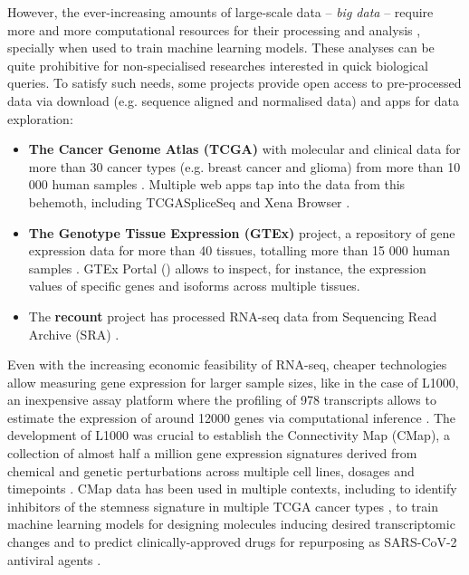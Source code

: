 However, the ever-increasing amounts of large-scale data -- \emph{big data} -- require more and more computational resources for their processing and analysis \cite{gauthier:2018ws}, specially when used to train machine learning models. These analyses can be quite prohibitive for non-specialised researches interested in quick biological queries. To satisfy such needs, some projects provide open access to pre-processed data via download (e.g. sequence aligned and normalised data) and apps for data exploration:

\begin{itemize}
	\item \textbf{The Cancer Genome Atlas (TCGA)} with molecular and clinical data for more than 30 cancer types (e.g. breast cancer and glioma) from more than 10 000 human samples \cite{chang:2013ww}. Multiple web apps tap into the data from this behemoth, including TCGASpliceSeq \cite{ryan:2016tm} and Xena Browser \cite{goldman:2020ub}.
	\item \textbf{The Genotype Tissue Expression (GTEx)} project, a repository of gene expression data for more than 40 tissues, totalling more than 15 000 human samples \cite{lonsdale:2013uo}. GTEx Portal () allows to inspect, for instance, the expression values of specific genes and isoforms across multiple tissues.
	\item The \textbf{recount} project has processed RNA-seq data from Sequencing Read Archive (SRA) \cite{collado-torres:2017uw,wilks:2021uc}.
\end{itemize}

Even with the increasing economic feasibility of RNA-seq, cheaper technologies allow measuring gene expression for larger sample sizes, like in the case of L1000, an inexpensive assay platform where the profiling of 978 transcripts allows to estimate the expression of around 12000 genes via computational inference \cite{subramanian:2017ul}. The development of L1000 was crucial to establish the Connectivity Map (CMap), a collection of almost half a million gene expression signatures derived from chemical and genetic perturbations across multiple cell lines, dosages and timepoints \cite{subramanian:2017ul}. CMap data has been used in multiple contexts, including to identify inhibitors of the stemness signature in multiple TCGA cancer types \cite{malta:2018uj}, to train machine learning models for designing molecules inducing desired transcriptomic changes \cite{mendez-lucio:2020th} and to predict clinically-approved drugs for repurposing as SARS-CoV-2 antiviral agents \cite{le:2021uq}.

